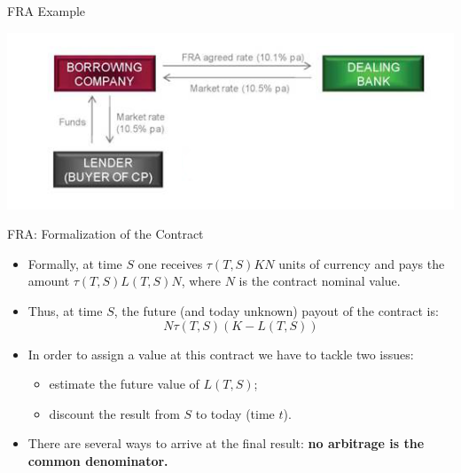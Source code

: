 \documentclass{beamer}
\begin{document}
\begin{frame}{FRA Example}
	\begin{center}
		\includegraphics[width=0.9\linewidth]{FRA_diagram}
	\end{center}
\end{frame}

\begin{frame}{FRA: Formalization of the Contract}
	\begin{itemize}
		\item<1-> Formally, at time $S$ one receives $\tau(T, S)KN$ units of currency and pays the amount $\tau(T,S)L(T,S)N$, where $N$ is the contract nominal value.
		\item<2-> Thus, at time $S$, the future (and today unknown) payout of the contract is: 
		\begin{equation}
			N\tau(T,S)(K-L(T,S))
			\label{eq:fra_payoff}
		\end{equation}
		\item<3-> In order to assign a value at this contract we have to tackle two issues:
		\begin{itemize}
			\item<4-> estimate the future value of $L(T, S)$;
			\item<5-> discount the result from $S$ to today (time $t$).
		\end{itemize}
		\item<6-> There are several ways to arrive at the final result: \textbf{no arbitrage is the common denominator.}
	\end{itemize}
\end{frame}

%	
%	
\end{document}
